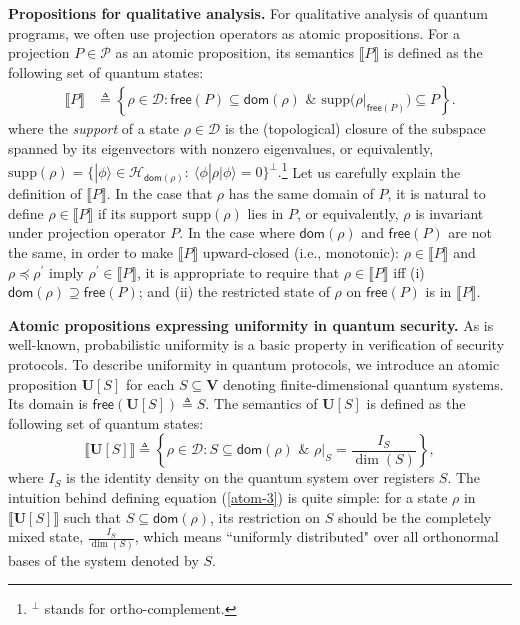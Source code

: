 \documentclass[conference,compsoc, 10pt]{IEEEtran}
\newcommand {\cD } {{\mathcal{D}}}
\newcommand {\cP } {{\mathcal{P}}}
\newcommand {\cH } {{\mathcal{H}}}
\newcommand {\cU } {{\mathcal{U}}}
\newcommand {\id } {{I}}
\newcommand {\dom }[1] {{\mathsf{dom}\!\left(#1\right)}}
\newcommand {\free }[1] {{\mathsf{free}\left(#1\right)}}
\newcommand {\rt }[2] {{\left.{#1}\right|_{#2}}}
\newcommand {\vars } {\mathbf{V}}
\newcommand {\unia } {{\mathbf{U}}}
\newcommand {\sem}[1] {\llbracket#1\rrbracket}
\newcommand {\supp } {{\mathrm{supp}}}
\def\>{\ensuremath{\rangle}}
\def\<{\ensuremath{\langle}}
\begin{document}
	\noindent\textbf{Propositions for qualitative analysis.} For qualitative analysis of quantum programs, we often use projection operators as atomic propositions.   
	For a projection $P\in\cP$ as an atomic proposition, its semantics $\sem{P}$ is defined as the following set of quantum states:
	\begin{equation}\label{atom-1}\begin{split}
	\sem{P} &\triangleq \left\{\rho\in\cD: \free{P}\subseteq\dom{\rho}\text{\ \&\ }\supp\big(\rt{\rho}{\free{P}}\big)\subseteq P\right\}. %
	\end{split}
	\end{equation}
	where the \emph{support} of a state $\rho\in\cD$ is the (topological) closure of the subspace spanned by its eigenvectors with nonzero eigenvalues, or equivalently, $\supp(\rho) = \{|\phi\>\in\cH_{\dom{\rho}}:\ \<\phi|\rho|\phi\> = 0\}^\bot.$\footnote{${}^\bot$ stands for ortho-complement.}
	Let us carefully explain the definition of $\sem{P}$. In the case that $\rho$ has the same domain of $P$, it is natural to define $\rho\in\sem{P}$ if its support $\supp(\rho)$ lies in $P$, or equivalently, $\rho$ is invariant under projection operator $P$. 
	In the case where $\dom{\rho}$ and $\free{P}$ are not the same, in order to make $\sem{P}$ upward-closed (i.e., monotonic): $\rho\in\sem{P}$ and $\rho\preceq\rho^\prime$ imply  $\rho^\prime\in\sem{P}$, it is appropriate to require that $\rho\in\sem{P}$ iff (i) $\dom{\rho}\supseteq\free{P}$; and (ii) the restricted state of $\rho$ on $\free{P}$ is in $\sem{P}$.
	
	
	{\vskip 3pt}
	
	\noindent\textbf{Atomic propositions expressing uniformity in quantum security.} As is well-known, probabilistic uniformity is a basic property in verification of security protocols. To describe uniformity in quantum protocols, we introduce an atomic proposition $\unia[S]$ for each $S\subseteq\vars$ denoting finite-dimensional quantum systems. Its domain is $\free{\unia[S]}\triangleq S$. 
	The semantics of $\unia[S]$ is defined as the following set of quantum states:
	\begin{equation}\label{atom-3}
	\sem{\unia[S]} \triangleq \left\{\rho\in\cD: S\subseteq\dom{\rho}\text{\ \&\ }\rt{\rho}{S} = \frac{\id_S}{\dim(S)}\right\},\end{equation}
  where $I_S$ is the identity density on the quantum system over registers $S$.
  The intuition behind defining equation (\ref{atom-3}) is quite simple: for a
  state $\rho$ in $\sem{\unia[S]}$ such that $S\subseteq\dom{\rho}$, its
  restriction on $S$ should be the completely mixed state,
  $\frac{\id_S}{\dim(S)}$, which means ``uniformly distributed" over all
  orthonormal bases of the system denoted by $S$. 
	
\end{document}
